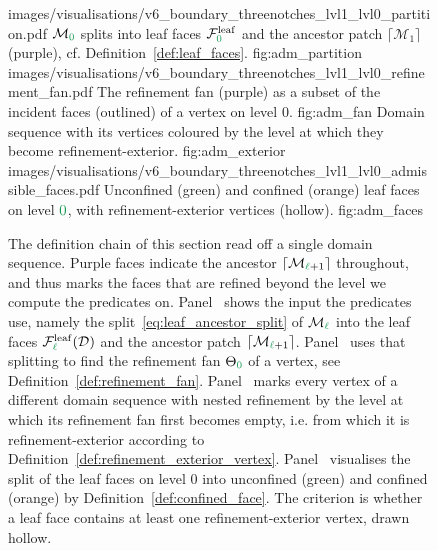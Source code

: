 \documentclass[a4paper, 12pt]{article}
\makeatletter
\newcommand{\green}{\color{ForestGreen}}
\newcommand{\F}{\mathcal{F}}
\renewcommand{\l}{{\green\ell}}
\newcommand{\lzero}{{\green 0}}
\newcommand{\M}{\mathcal{M}}
\theoremstyle{definition}
\theoremstyle{plain}
\numberwithin{equation}{section}
\newcommand{\ancestorPatch}[1]{\lceil #1 \rceil}
\DeclareRobustCommand{\domseq}[1][]{\mathcal{D}\ifx\@empty#1\@empty\else_{#1}\fi}
\newcommand{\refFan}[1]{\Theta_{#1}}                        %
\newcommand{\leafF}[1]{\F^{\mathrm{leaf}}_{#1}}             %
\makeatother
\begin{document}
\begin{figure}[tb]
    \centering
    \cvsubfig
        {images/visualisations/v6_boundary_threenotches_lvl1_lvl0_partition.pdf}
        {$\M_\lzero$ splits into leaf faces $\leafF{\lzero}$ and the ancestor patch $\ancestorPatch{\M_1}$ (purple), cf. Definition~\ref{def:leaf_faces}.}
        {fig:adm_partition}
    \hfill
    \cvsubfig
        {images/visualisations/v6_boundary_threenotches_lvl1_lvl0_refinement_fan.pdf}
        {The refinement fan (purple) as a subset of the incident faces (outlined) of a vertex on level $0$.}
        {fig:adm_fan}
    \hfill
        {Domain sequence with its vertices coloured by the level at which they become refinement-exterior.}
        {fig:adm_exterior}
    \hfill
    \cvsubfig
        {images/visualisations/v6_boundary_threenotches_lvl1_lvl0_admissible_faces.pdf}
        {Unconfined (green) and confined (orange) leaf faces on level $\lzero$, with refinement-exterior vertices (hollow).}
        {fig:adm_faces}
    \caption{The definition chain of this section read off a single domain sequence. Purple faces indicate the ancestor $\ancestorPatch{\M_{\l+1}}$ throughout, and thus marks the faces that are refined beyond the level we compute the predicates on. Panel~ shows the input the predicates use, namely the split~\eqref{eq:leaf_ancestor_split} of $\M_\l$ into the leaf faces $\leafF{\l}(\domseq)$ and the ancestor patch $\ancestorPatch{\M_{\l+1}}$. Panel~ uses that splitting to find the refinement fan $\refFan{\lzero}$ of a vertex, see Definition~\ref{def:refinement_fan}. Panel~ marks every vertex of a different domain sequence with nested refinement by the level at which its refinement fan first becomes empty, i.e. from which it is refinement-exterior according to Definition~\ref{def:refinement_exterior_vertex}. Panel~ visualises the split of the leaf faces on level $0$ into unconfined (green) and confined (orange) by Definition~\ref{def:confined_face}. The criterion is whether a leaf face contains at least one refinement-exterior vertex, drawn hollow.}
    \label{fig:admissibility_chain}
\end{figure}
\end{document}
